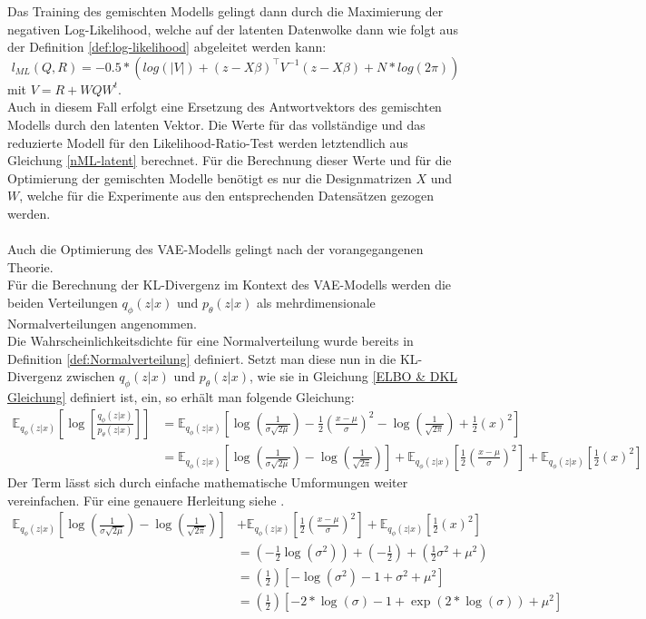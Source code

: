 \documentclass[%
thesis=student,%
coverpage=false,%
titlepage=false,%
headmarks=true, %
german,%
font=libertine, %
math=newpxtx, %
BCOR=5mm,%
coverBCOR=11mm%
]{tumbook}
\theoremstyle{break}
\begin{document}
Das Training des gemischten Modells gelingt dann durch die Maximierung der negativen Log-Likelihood, welche auf der latenten Datenwolke dann wie folgt aus der Definition \ref{def:log-likelihood} abgeleitet werden kann:
$$ l_{ML}(Q,R) = -0.5 * (log(|V|)+ (z-X\beta)^{\top}V^{-1}(z-X\beta) + N * log(2\pi))$$\label{nML-latent}
mit $V= R + WQW^t$.\\
Auch in diesem Fall erfolgt eine Ersetzung des Antwortvektors des gemischten Modells durch den latenten Vektor.
Die Werte für das vollständige und das reduzierte Modell für den Likelihood-Ratio-Test werden letztendlich aus Gleichung \ref{nML-latent} berechnet. Für die Berechnung dieser Werte und für die Optimierung der gemischten Modelle benötigt es nur die Designmatrizen $X$ und $W$, welche für die Experimente aus den entsprechenden Datensätzen gezogen werden.\\
\\
Auch die Optimierung des VAE-Modells gelingt nach der vorangegangenen Theorie. \\
Für die Berechnung der KL-Divergenz im Kontext des VAE-Modells werden die beiden Verteilungen $q_\phi(z|x)$ und $p_\theta(z|x)$ als mehrdimensionale Normalverteilungen angenommen. \\
Die Wahrscheinlichkeitsdichte für eine Normalverteilung wurde bereits in Definition \ref{def:Normalverteilung} definiert. Setzt man diese nun in die KL-Divergenz zwischen $q_\phi(z|x)$ und $p_\theta(z|x)$, wie sie in Gleichung \ref{ELBO & DKL Gleichung} definiert ist, ein, so erhält man folgende Gleichung:
\begin{align}
	\mathbb{E}_{q_\phi(z|x)}\left[\log\left[ \frac{q_\phi(z|x)}{p_\theta(z|x)}\right]\right] &=\mathbb{E}_{q_\phi(z|x)}\left[\log\left(\frac{1}{\sigma\sqrt{2\mu}}\right)- \frac{1}{2}\left(\frac{x-\mu}{\sigma}\right)^2 - \log\left(\frac{1}{\sqrt{2\pi}}\right)+ \frac{1}{2}(x)^2\right] \\
	&=\mathbb{E}_{q_\phi(z|x)}\left[\log\left(\frac{1}{\sigma\sqrt{2\mu}}\right) - \log\left(\frac{1}{\sqrt{2\pi}}\right)\right] + \mathbb{E}_{q_\phi(z|x)}\left[ \frac{1}{2}\left(\frac{x-\mu}{\sigma}\right)^2\right] + \mathbb{E}_{q_\phi(z|x)}\left[\frac{1}{2}(x)^2\right] 
\end{align}
Der Term lässt sich durch einfache mathematische Umformungen weiter vereinfachen. Für eine genauere Herleitung siehe \cite{KL-Div}.
\begin{align}
	\mathbb{E}_{q_\phi(z|x)}\left[\log\left(\frac{1}{\sigma\sqrt{2\mu}}\right) - \log\left(\frac{1}{\sqrt{2\pi}}\right)\right] &+ \mathbb{E}_{q_\phi(z|x)}\left[ \frac{1}{2}\left(\frac{x-\mu}{\sigma}\right)^2\right] + \mathbb{E}_{q_\phi(z|x)}\left[\frac{1}{2}(x)^2\right] \\
	&= (-\frac{1}{2}\log(\sigma^2)) + (-\frac{1}{2}) + (\frac{1}{2}\sigma^2 + \mu^2) \\
	&= (\frac{1}{2})[-\log(\sigma^2)-1+\sigma^2+\mu^2] \\
	&= (\frac{1}{2})[-2*\log(\sigma)-1+ \exp(2* \log(\sigma))+\mu^2]
\end{align}
\end{document}
